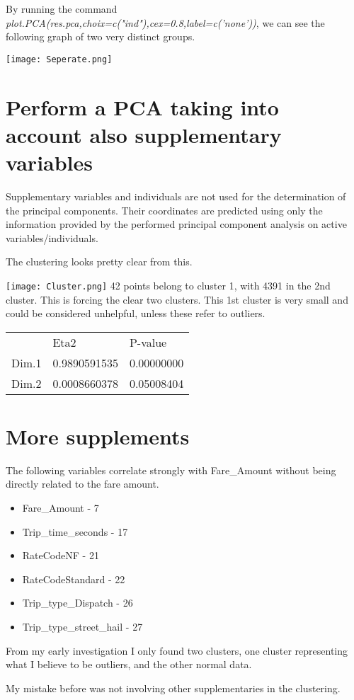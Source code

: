 \documentclass{article}
\begin{document}
By running the command \textit{plot.PCA(res.pca,choix=c("ind"),cex=0.8,label=c('none'))}, we can see the following graph of two very distinct groups.

\texttt{[image: Seperate.png]}

\section{Perform a PCA taking into account also supplementary variables}
Supplementary variables and individuals are not used for the determination of the principal components. Their coordinates are predicted using only the information provided by the performed principal component analysis on active variables/individuals.

The clustering looks pretty clear from this.

\texttt{[image: Cluster.png]}
42 points belong to cluster 1, with 4391 in the 2nd cluster. This is forcing the clear two clusters. This 1st cluster is very small and could be considered unhelpful, unless these refer to outliers.

\label{my-label}
\begin{tabular}{lll}
       &       Eta2  &  P-value \\
Dim.1 & 0.9890591535 & 0.00000000 \\
Dim.2 & 0.0008660378 & 0.05008404
\end{tabular}

\section{More supplements}
The following variables correlate strongly with Fare\_Amount without being directly related to the fare amount.
\begin{itemize}
\item Fare\_Amount - 7
\item Trip\_time\_seconds - 17
\item RateCodeNF - 21
\item RateCodeStandard - 22
\item Trip\_type\_Dispatch - 26
\item Trip\_type\_street\_hail - 27
\end{itemize}

From my early investigation I only found two clusters, one cluster representing what I believe to be outliers, and the other normal data.

My mistake before was not involving other supplementaries in the clustering.
\end{document}

